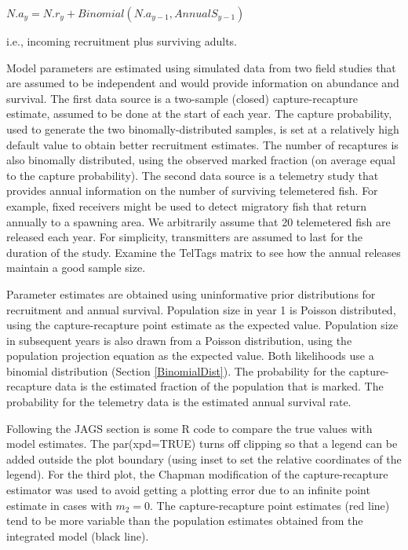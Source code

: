 \documentclass[
]{krantz}
\begin{document}
\(N.a_y = N.r_y + Binomial(N.a_{y-1}, AnnualS_{y-1})\)

i.e., incoming recruitment plus surviving adults.

Model parameters are estimated using simulated data from two field studies that are assumed to be independent and would provide information on abundance and survival. The first data source is a two-sample (closed) capture-recapture estimate, assumed to be done at the start of each year. The capture probability, used to generate the two binomally-distributed samples, is set at a relatively high default value to obtain better recruitment estimates. The number of recaptures is also binomally distributed, using the observed marked fraction (on average equal to the capture probability). The second data source is a telemetry study that provides annual information on the number of surviving telemetered fish. For example, fixed receivers might be used to detect migratory fish that return annually to a spawning area. We arbitrarily assume that 20 telemetered fish are released each year. For simplicity, transmitters are assumed to last for the duration of the study. Examine the TelTags matrix to see how the annual releases maintain a good sample size.

Parameter estimates are obtained using uninformative prior distributions for recruitment and annual survival. Population size in year 1 is Poisson distributed, using the capture-recapture point estimate as the expected value. Population size in subsequent years is also drawn from a Poisson distribution, using the population projection equation as the expected value. Both likelihoods use a binomial distribution (Section \ref{BinomialDist}). The probability for the capture-recapture data is the estimated fraction of the population that is marked. The probability for the telemetry data is the estimated annual survival rate.

Following the JAGS section is some R code to compare the true values with model estimates. The par(xpd=TRUE) turns off clipping so that a legend can be added outside the plot boundary (using inset to set the relative coordinates of the legend). For the third plot, the Chapman modification of the capture-recapture estimator \citep{ricker1975} was used to avoid getting a plotting error due to an infinite point estimate in cases with \(m_2=0\). The capture-recapture point estimates (red line) tend to be more variable than the population estimates obtained from the integrated model (black line).
\end{document}
